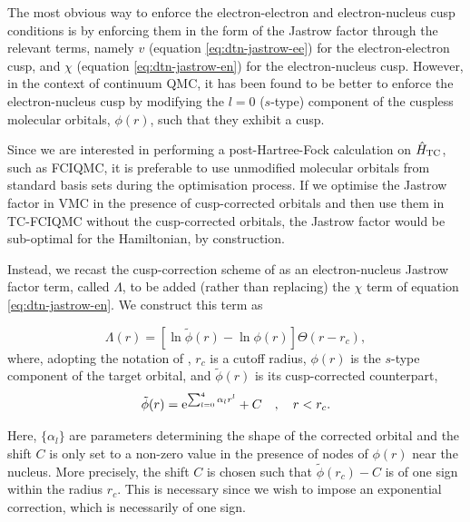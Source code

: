 The most obvious way to enforce the electron-electron and electron-nucleus cusp conditions is by enforcing them in the form of the Jastrow factor through the relevant terms, namely $v$ (equation \ref{eq:dtn-jastrow-ee}) for the electron-electron cusp, and $\chi$ (equation \ref{eq:dtn-jastrow-en}) for the electron-nucleus cusp. However, in the context of continuum \gls{QMC}, it has been found to be better\supercite{drummondJastrow,needsVariational2020,maScheme2005} to enforce the electron-nucleus cusp by modifying the $l=0$ ($s$-type) component of the cuspless molecular orbitals, $\phi(r)$, such that they exhibit a cusp.

Since we are interested in performing a post-Hartree-Fock calculation on $\hat H_\mathrm{TC}$, such as \gls{FCIQMC}, it is preferable to use unmodified molecular orbitals from standard basis sets during the optimisation process. If we optimise the Jastrow factor in \gls{VMC} in the presence of cusp-corrected orbitals and then use them in TC-FCIQMC without the cusp-corrected orbitals, the Jastrow factor would be sub-optimal for the Hamiltonian, by construction.

Instead, we recast the cusp-correction scheme of  as an electron-nucleus Jastrow factor term, called $\Lambda$, to be added (rather than replacing) the $\chi$ term of equation \ref{eq:dtn-jastrow-en}. We construct this term as

\begin{equation}
    \label{eq:cusp-corr-1}
    \Lambda(r)  = \left[ \ln \tilde \phi(r) - \ln \phi(r) \right]\Theta(r-r_{c}),
\end{equation}
where, adopting the notation of , $r_c$ is a cutoff radius, $\phi(r)$ is the $s$-type component of the target orbital, and $\tilde \phi(r)$ is its cusp-corrected counterpart,
\begin{equation}
    \label{eq:cusp-corr-2}
  \tilde \phi(r) = \mathrm{e}^{\sum_{l=0}^4 \alpha_l r^l} + C \quad,\quad r<r_{c}.
\end{equation}

Here, $\{\alpha_l\}$ are parameters determining the shape of the
corrected orbital and the shift $C$ is only set to a non-zero value in
the presence of nodes of $\phi(r)$ near the nucleus. More precisely, the shift $C$ is chosen such that $\tilde\phi(r_c)-C$ is of one sign within the radius $r_c$. This is necessary since we wish to impose an exponential correction, which is necessarily of one sign.


